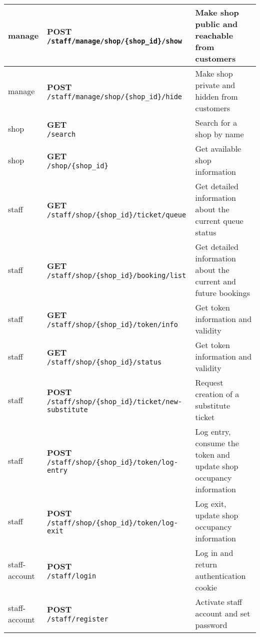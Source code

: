 \begin{tabularx}{\textwidth}{|p{}|l|X|}
manage & \makecell{\textbf{POST} \\ \texttt{/staff/manage/shop/\{shop\_id\}/show}}  & Make shop public and reachable from customers \\\hline
manage & \makecell{\textbf{POST} \\ \texttt{/staff/manage/shop/\{shop\_id\}/hide}}  & Make shop private and hidden from customers \\\hline
shop & \makecell{\textbf{GET} \\ \texttt{/search}}  & Search for a shop by name \\\hline
shop & \makecell{\textbf{GET} \\ \texttt{/shop/\{shop\_id\}}}  & Get available shop information \\\hline
staff & \makecell{\textbf{GET} \\ \texttt{/staff/shop/\{shop\_id\}/ticket/queue}}  & Get detailed information about the current queue status \\\hline
staff & \makecell{\textbf{GET} \\ \texttt{/staff/shop/\{shop\_id\}/booking/list}}  & Get detailed information about the current and future bookings \\\hline
staff & \makecell{\textbf{GET} \\ \texttt{/staff/shop/\{shop\_id\}/token/info}}  & Get token information and validity \\\hline
staff & \makecell{\textbf{GET} \\ \texttt{/staff/shop/\{shop\_id\}/status}}  & Get token information and validity \\\hline
staff & \makecell{\textbf{POST} \\ \texttt{/staff/shop/\{shop\_id\}/ticket/new-substitute}}  & Request creation of a substitute ticket \\\hline
staff & \makecell{\textbf{POST} \\ \texttt{/staff/shop/\{shop\_id\}/token/log-entry}}  & Log entry, consume the token and update shop occupancy information \\\hline
staff & \makecell{\textbf{POST} \\ \texttt{/staff/shop/\{shop\_id\}/token/log-exit}}  & Log exit, update shop occupancy information \\\hline
staff-account & \makecell{\textbf{POST} \\ \texttt{/staff/login}}  & Log in and return authentication cookie \\\hline
staff-account & \makecell{\textbf{POST} \\ \texttt{/staff/register}}  & Activate staff account and set password \\\hline

\end{tabularx}
